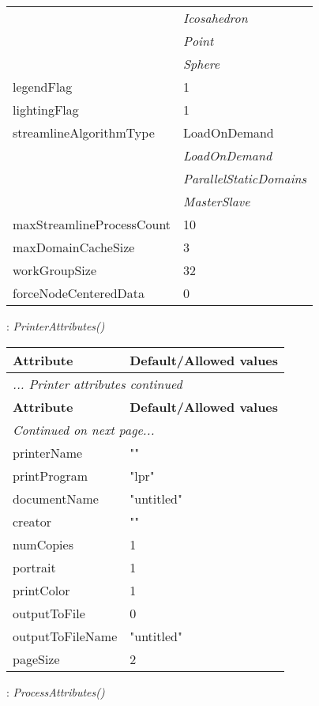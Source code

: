 \documentclass[10pt,a4paper]{report}
\begin{document}
\begin{longtable}{ll}
 & {\it  Icosahedron} \\
 & {\it  Point} \\
 & {\it  Sphere} \\
legendFlag  &  1 \\
lightingFlag  &  1 \\
streamlineAlgorithmType  &  LoadOnDemand   \\
 & {\it  LoadOnDemand} \\
 & {\it  ParallelStaticDomains} \\
 & {\it  MasterSlave} \\
maxStreamlineProcessCount  &  10 \\
maxDomainCacheSize  &  3 \\
workGroupSize  &  32 \\
forceNodeCenteredData  &  0 \\
\end{longtable}

\newpage

{}
: {\it PrinterAttributes() }\\[-3mm]

\begin{longtable}{ll}
{\bf Attribute} & {\bf Default/Allowed values} \\
\hline \hline
\endfirsthead
\multicolumn{2}{l}{{\it ... Printer attributes continued}} \\
{\bf Attribute} & {\bf Default/Allowed values} \\
\hline \hline
\endhead
\hline
\multicolumn{2}{l}{{\it Continued on next page...}} \\
\endfoot
\hline
\endlastfoot

printerName  &  "" \\
printProgram  &  "lpr" \\
documentName  &  "untitled" \\
creator  &  "" \\
numCopies  &  1 \\
portrait  &  1 \\
printColor  &  1 \\
outputToFile  &  0 \\
outputToFileName  &  "untitled" \\
pageSize  &  2 \\
\end{longtable}

\newpage

{}
: {\it ProcessAttributes() }\\[-3mm]
\end{document}
